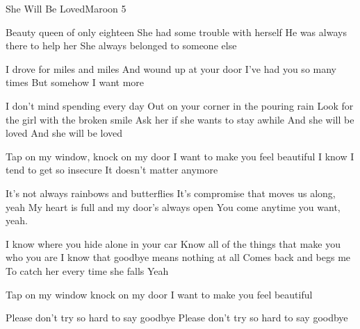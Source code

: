 \documentclass[a4paper,11pt,french]{article}
\begin{document}
\begin{Song}{She Will Be Loved}{Maroon 5}

\begin{multicols}{2}
\begin{Verse}
Beauty queen of only eighteen
She had some trouble with herself
He was always there to help her
She always belonged to someone else
\end{Verse}
\espaceInterStrophe

\begin{PreChorus}
I drove for miles and miles 
And wound up at your door
I've had you so many times 
But somehow I want more
\end{PreChorus}
\espaceInterStrophe

\begin{Chorus}
I don't mind spending every day
Out on your corner in the pouring rain
Look for the girl with the broken smile
Ask her if she wants to stay awhile
And she will be loved
And she will be loved
\end{Chorus}
\espaceInterStrophe

\begin{Verse}
Tap on my window, knock on my door
I want to make you feel beautiful
I know I tend to get so insecure
It doesn't matter anymore
\end{Verse}
\vfill
\columnbreak

\begin{PreChorus}
It's not always rainbows and butterflies
It's compromise that moves us along, yeah
My heart is full and my door's always open
You come anytime you want, yeah.
\end{PreChorus}
\espaceInterStrophe

\tochorus
\espaceInterStrophe

\begin{Bridge}
I know where you hide alone in your car
Know all of the things that make you who you are
I know that goodbye means nothing at all
Comes back and begs me 
To catch her every time she falls
Yeah
\end{Bridge}
\espaceInterStrophe

\begin{Verse}
Tap on my window knock on my door
I want to make you feel beautiful
\end{Verse}
\espaceInterStrophe

\tochorus
\espaceInterStrophe

\begin{Chorus}
Please don't try so hard to say goodbye
Please don't try so hard to say goodbye
\end{Chorus}
\espaceInterStrophe
\end{multicols}
\vfill


\end{Song}
\end{document}
